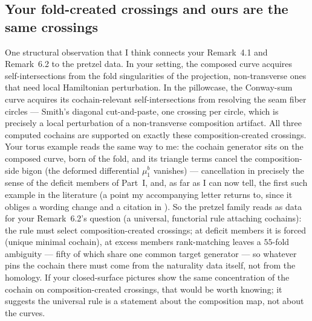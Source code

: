 \documentclass[11pt,reqno]{amsart}
\theoremstyle{plain}
\theoremstyle{definition}
\newcommand{\bc}{b}
\begin{document}
\subsection{Your fold-created crossings and ours are the same crossings}\label{ss:universal}
One structural observation that I think connects your Remark~4.1 and Remark~6.2 to the
pretzel data. In your setting, the composed curve acquires self-intersections from the fold
singularities of the projection, non-transverse ones that need local Hamiltonian
perturbation. In the pillowcase, the Conway-sum curve acquires its cochain-relevant
self-intersections from resolving the seam fiber circles --- Smith's diagonal cut-and-paste,
one crossing per circle, which is precisely a local perturbation of a non-transverse
composition artifact. All three computed cochains are supported on exactly these
composition-created crossings. Your torus example \cite[\S5]{Z1} reads the same way to me:
the cochain generator sits on the composed curve, born of the fold, and its triangle terms
cancel the composition-side bigon (the deformed differential $\mu_1^{\bc}$ vanishes) ---
cancellation in precisely the sense of
the deficit members of Part~I, and, as far as I can now tell, the first such example in the
literature (a point my accompanying letter returns to, since it obliges a wording change and
a citation in \cite{P2}). So the pretzel family reads as data for your Remark~6.2's
question (a universal, functorial rule attaching cochains): the rule must select
composition-created crossings; at deficit members it is forced (unique minimal cochain), at
excess members rank-matching leaves a $55$-fold ambiguity --- fifty of which share one
common target generator --- so whatever pins the cochain there must come from the naturality
data itself, not from the homology. If your closed-surface pictures show the same
concentration of the cochain on composition-created crossings, that would be worth knowing;
it suggests the universal rule is a statement about the composition map, not about the
curves.
\end{document}
